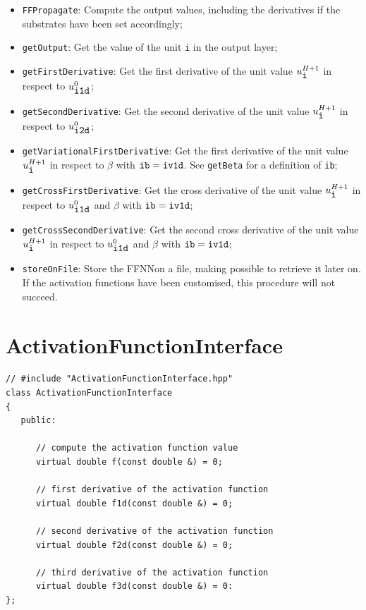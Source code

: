 \documentclass[11pt,a4paper,twoside]{article}
\begin{document}
\begin{itemize}
\item \verb+FFPropagate+: Compute the output values, including the derivatives if the substrates have been set accordingly;
\item \verb+getOutput+: Get the value of the unit \verb+i+ in the output layer;
\item \verb+getFirstDerivative+: Get the first derivative of the unit value $u^{H+1}_{\verb+i+}$ in respect to $u^0_{\verb+i1d+}$;
\item \verb+getSecondDerivative+: Get the second derivative of the unit value $u^{H+1}_{\verb+i+}$ in respect to $u^0_{\verb+i2d+}$;
\item \verb+getVariationalFirstDerivative+: Get the first derivative of the unit value $u^{H+1}_{\verb+i+}$ in respect to $\beta$ with $\verb+ib+ = \verb+iv1d+$. See \verb+getBeta+ for a definition of \verb+ib+;
\item \verb+getCrossFirstDerivative+: Get the cross derivative of the unit value $u^{H+1}_{\verb+i+}$ in respect to $u^0_{\verb+i1d+}$ and $\beta$ with $\verb+ib+ = \verb+iv1d+$;
\item \verb+getCrossSecondDerivative+: Get the second cross derivative of the unit value $u^{H+1}_{\verb+i+}$ in respect to $u^0_{\verb+i1d+}$ and $\beta$ with $\verb+ib+ = \verb+iv1d+$;
\item \verb+storeOnFile+: Store the FFNNon a file, making possible to retrieve it later on. If the activation functions have been customised, this procedure will not succeed.
\end{itemize}




\section{ActivationFunctionInterface} %
\label{sec:activationfunctioninterface}

\begin{verbatim}
// #include "ActivationFunctionInterface.hpp"
class ActivationFunctionInterface
{
   public:

      // compute the activation function value
      virtual double f(const double &) = 0;

      // first derivative of the activation function
      virtual double f1d(const double &) = 0;

      // second derivative of the activation function
      virtual double f2d(const double &) = 0;

      // third derivative of the activation function
      virtual double f3d(const double &) = 0:
};
\end{verbatim}
\end{document}
